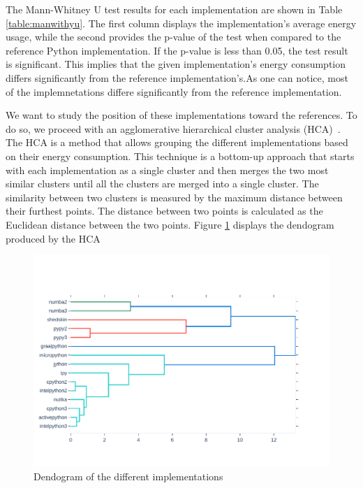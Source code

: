 The Mann-Whitney U test results for each implementation are shown in Table \ref{table:manwithyu}. The first column displays the implementation's average energy usage, while the second provides the p-value of the test when compared to the reference Python implementation. If the p-value is less than 0.05, the test result is significant. This implies that the given implementation's energy consumption differs significantly from the reference implementation's.As one can notice, most of the implemnetations differe significantly from the reference implementation. 

We want to study the position of these implementations toward the references. To do so, we proceed with an agglomerative hierarchical cluster analysis (HCA)~\cite{johnson1967hierarchical}.
The HCA is a method that allows grouping the different implementations based on their energy consumption. This technique is a bottom-up approach that starts with each implementation as a single cluster and then merges the two most similar clusters until all the clusters are merged into a single cluster. The similarity between two clusters is measured by the maximum distance between their furthest points. The distance between two points is calculated as the Euclidean distance between the two points.
Figure \ref{fig:dendogram} displays the dendogram produced by the HCA
\begin{figure}
      \centering
      \includegraphics[width=\linewidth]{imgs/dendogram_interpreters}
      \caption{Dendogram of the different implementations}
      \label{fig:dendogram}
\end{figure}

